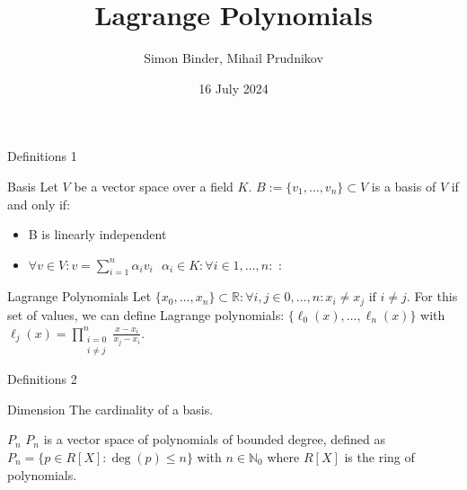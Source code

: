\documentclass[8pt]{beamer}
\title{Lagrange Polynomials}
\date{16 July 2024}
\author{Simon Binder, Mihail Prudnikov}
\begin{document}
	\begin{frame}[plain]
		\maketitle
	\end{frame}
	
	\begin{frame}{Definitions 1}
		\begin{block}{Basis}
			Let $V$ be a vector space over a field $K$. $B :=\{ v_1, \ldots, v_n\}\subset V $ is a basis of $V$ if and only if:
			\begin{itemize}
				\item B is linearly independent
				\item
				 $\forall v \in V:  v = \sum_{i=1}^{n}\alpha_i v_i\text{   } \alpha_i \in K:\forall i\in 1,\ldots,n:$ : 
			\end{itemize}\cite{basis}
		\end{block}
		\begin{block}{Lagrange Polynomials}
			Let $\{x_0, \ldots, x_n \} \subset \mathbb{R}: \forall i,j \in 0, \ldots ,n: x_i \neq x_j \text{ if } i \neq j$. For this set of values, we can define Lagrange polynomials: $\{\ell_0(x), \ldots, \ell_n(x)\}$ with \\ $\ell_j(x) = 
			\displaystyle \prod_{\substack{i= 0 \\ i \neq j }}^{n}\frac{x - x_i}{x_j - x_i}$. \cite{lagrange}
		\end{block}
	\end{frame}
	
	\begin{frame}{Definitions 2}
		\begin{block}{Dimension}
			The cardinality of a basis. \cite{basis}
		\end{block}
		\begin{block}{$P_n$}
			$P_n$ is a vector space of polynomials of bounded degree, defined as $P_n = \{p \in R[X] : \deg(p) \leq n \}$ with $n \in \mathbb{N}_0$ where $R[X]$ is the ring of polynomials.\cite{lagrange}
		\end{block}
	\end{frame}
	
\end{document}
